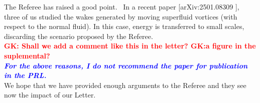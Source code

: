 \documentclass[a4paper,10pt]{article}
\def\red#1{\textcolor{red}{#1}}
\def\blue#1{\textcolor{blue}{#1}}
\def\refcomment#1{\textbf{\blue{\emph{#1}}}\\}
\begin{document}
The Referee has raised a good point.  In a recent paper [arXiv:2501.08309 ], three of us studied the wakes generated by moving superfluid vortices (with respect to the normal fluid). In this case, energy is transferred to small scales, discarding the scenario proposed by the Referee.\\

\red{\textbf{GK: Shall we add a comment like this in the letter? GK:a figure in the suplemental? }}\\

\refcomment{For the above reasons, I do not recommend the paper for publication in the PRL.}

\noindent We hope that we have provided enough arguments to the Referee and they see now the impact of our Letter.
\end{document}
